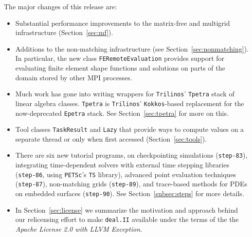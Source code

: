 \documentclass{ansarticle-preprint}
\newcommand{\specialword}[1]{\texttt{#1}}
\newcommand{\dealii}{{\specialword{deal.II}}\xspace}
\newcommand{\trilinos}{{\specialword{Trilinos}}\xspace}
\newcommand{\petsc}{\specialword{PETSc}\xspace}
\newcommand{\ts}{{\specialword{TS}}\xspace}
\newcommand{\kokkos}{{\specialword{Kokkos}}\xspace}
\newcommand{\step}[1]{{\specialword{step-#1}}\xspace}
\newcommand{\epetra}{{\specialword{Epetra}}\xspace}
\newcommand{\tpetra}{{\specialword{Tpetra}}\xspace}
\begin{document}
The major changes of this release are:
%
\begin{itemize}
  \item
    Substantial performance improvements to the matrix-free and multigrid
    infrastructure (Section~\ref{sec:mf}).
  \item
    Additions to the non-matching infrastructure (see
    Section~\ref{sec:nonmatching}). In particular, the new class
    \texttt{FERemoteEvaluation} provides support for evaluating finite
    element shape functions and solutions on parts of the domain stored by
    other MPI processes.
  \item
    Much work has gone into writing wrappers for \trilinos' \tpetra{} stack
    of linear algebra classes. \tpetra{} is \trilinos' \kokkos-based
    replacement for the now-deprecated \epetra{} stack. See
    Section~\ref{sec:tpetra} for more on this.
  \item
    Tool classes \texttt{TaskResult} and \texttt{Lazy} that provide ways to
    compute values on a separate thread or only when first accessed
    (Section~\ref{sec:tools}).
  \item
    There are six new tutorial programs, on checkpointing simulations
    (\step{83}), integrating time-dependent solvers with external time
    stepping libraries (\step{86}, using \petsc's \ts{} library), advanced
    point evaluation techniques (\step{87}), non-matching grids (\step{89}),
    and trace-based methods for PDEs on embedded surfaces (\step{90}). See
    Section~\ref{subsec:steps} for more details.
  \item
    In Section~\ref{sec:license} we summarize the motivation and approach
    behind our relicensing effort to make \dealii available under the terms
    of the the \emph{Apache License 2.0 with LLVM Exception}.
\end{itemize}
%
\end{document}
